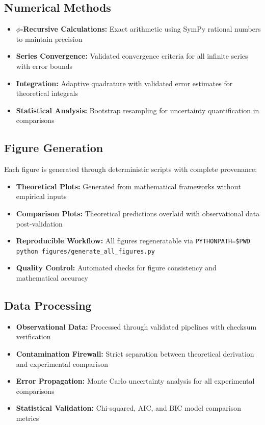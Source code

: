 \documentclass[12pt]{article}
\begin{document}
\subsection{Numerical Methods}

\begin{itemize}
    \item \textbf{$\phi$-Recursive Calculations:} Exact arithmetic using SymPy rational numbers to maintain precision
    \item \textbf{Series Convergence:} Validated convergence criteria for all infinite series with error bounds
    \item \textbf{Integration:} Adaptive quadrature with validated error estimates for theoretical integrals
    \item \textbf{Statistical Analysis:} Bootstrap resampling for uncertainty quantification in comparisons
\end{itemize}

\subsection{Figure Generation}

Each figure is generated through deterministic scripts with complete provenance:
\begin{itemize}
    \item \textbf{Theoretical Plots:} Generated from mathematical frameworks without empirical inputs
    \item \textbf{Comparison Plots:} Theoretical predictions overlaid with observational data post-validation
    \item \textbf{Reproducible Workflow:} All figures regeneratable via \texttt{PYTHONPATH=\$PWD python figures/generate\_all\_figures.py}
    \item \textbf{Quality Control:} Automated checks for figure consistency and mathematical accuracy
\end{itemize}

\subsection{Data Processing}

\begin{itemize}
    \item \textbf{Observational Data:} Processed through validated pipelines with checksum verification
    \item \textbf{Contamination Firewall:} Strict separation between theoretical derivation and experimental comparison
    \item \textbf{Error Propagation:} Monte Carlo uncertainty analysis for all experimental comparisons
    \item \textbf{Statistical Validation:} Chi-squared, AIC, and BIC model comparison metrics
\end{itemize}
\end{document}
